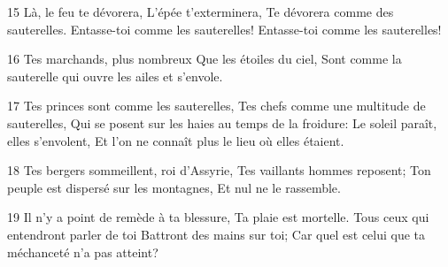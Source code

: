 \par 15 Là, le feu te dévorera, L'épée t'exterminera, Te dévorera comme des sauterelles. Entasse-toi comme les sauterelles! Entasse-toi comme les sauterelles!
\par 16 Tes marchands, plus nombreux Que les étoiles du ciel, Sont comme la sauterelle qui ouvre les ailes et s'envole.
\par 17 Tes princes sont comme les sauterelles, Tes chefs comme une multitude de sauterelles, Qui se posent sur les haies au temps de la froidure: Le soleil paraît, elles s'envolent, Et l'on ne connaît plus le lieu où elles étaient.
\par 18 Tes bergers sommeillent, roi d'Assyrie, Tes vaillants hommes reposent; Ton peuple est dispersé sur les montagnes, Et nul ne le rassemble.
\par 19 Il n'y a point de remède à ta blessure, Ta plaie est mortelle. Tous ceux qui entendront parler de toi Battront des mains sur toi; Car quel est celui que ta méchanceté n'a pas atteint?


